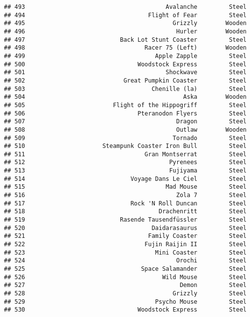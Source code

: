 \documentclass[
]{article}
\begin{document}
\begin{verbatim}
## 493                                        Avalanche         Steel
## 494                                   Flight of Fear         Steel
## 495                                          Grizzly        Wooden
## 496                                           Hurler        Wooden
## 497                           Back Lot Stunt Coaster         Steel
## 498                                  Racer 75 (Left)        Wooden
## 499                                     Apple Zapple         Steel
## 500                                Woodstock Express         Steel
## 501                                        Shockwave         Steel
## 502                            Great Pumpkin Coaster         Steel
## 503                                    Chenille (la)         Steel
## 504                                             Aska        Wooden
## 505                         Flight of the Hippogriff         Steel
## 506                                Pteranodon Flyers         Steel
## 507                                           Dragon         Steel
## 508                                           Outlaw        Wooden
## 509                                          Tornado         Steel
## 510                      Steampunk Coaster Iron Bull         Steel
## 511                                  Gran Montserrat         Steel
## 512                                         Pyrenees         Steel
## 513                                         Fujiyama         Steel
## 514                              Voyage Dans Le Ciel         Steel
## 515                                        Mad Mouse         Steel
## 516                                           Zola 7         Steel
## 517                              Rock 'N Roll Duncan         Steel
## 518                                      Drachenritt         Steel
## 519                           Rasende Tausendfüssler         Steel
## 520                                    Daidarasaurus         Steel
## 521                                   Family Coaster         Steel
## 522                                  Fujin Raijin II         Steel
## 523                                     Mini Coaster         Steel
## 524                                           Orochi         Steel
## 525                                 Space Salamander         Steel
## 526                                       Wild Mouse         Steel
## 527                                            Demon         Steel
## 528                                          Grizzly         Steel
## 529                                     Psycho Mouse         Steel
## 530                                Woodstock Express         Steel

\end{verbatim}
\end{document}
